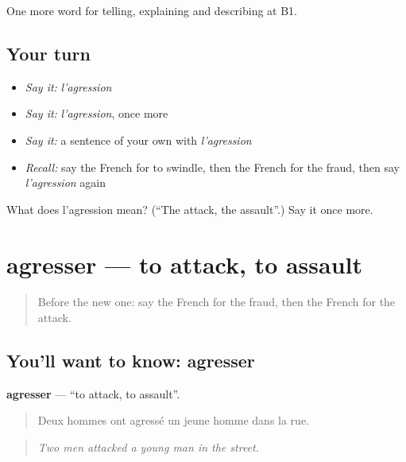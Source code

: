 \begin{grammarlens}[title={What you've built}]
One more word for telling, explaining and describing at B1.
\end{grammarlens}

\subsection*{Your turn}
\begin{itemize}
\raggedright
  \item \emph{Say it:} \emph{l'agression}
  \item \emph{Say it:} \emph{l'agression}, once more
  \item \emph{Say it:} a sentence of your own with \emph{l'agression}
  \item \emph{Recall:} say the French for to swindle, then the French for the fraud, then say \emph{l'agression} again
\end{itemize}

\begin{tcolorbox}[breakable,colback=teal!4,colframe=teal!35!black,title={Before you move on}]
What does l'agression mean? (\textquotedblleft{}The attack, the assault\textquotedblright{}.) Say it once more.
\end{tcolorbox}
\section[agresser]{agresser — to attack, to assault}

\label{lesson:FR-C289-agresser}



\begin{quote}
Before the new one: say the French for the fraud, then the French for the attack.
\end{quote}

\subsection*{You'll want to know: agresser}
\textbf{agresser} — \textquotedblleft{}to attack, to assault\textquotedblright{}.

\begin{quote}
Deux hommes ont agressé un jeune homme dans la rue.
\end{quote}

\begin{quote}
\emph{Two men attacked a young man in the street.}
\end{quote}

